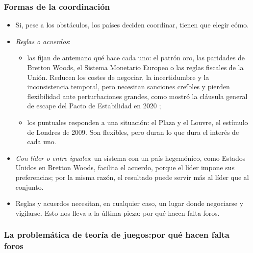 \documentclass[11pt]{article}
\begin{document}
\subsubsection{Formas de la coordinación}\label{sec:formas}

\begin{itemize}
\item Si, pese a los obstáculos, los países deciden coordinar, tienen que elegir cómo.
\item \emph{Reglas o acuerdos}:
  \begin{itemize}
  \item las  fijan de antemano qué hace cada uno: el patrón oro, las paridades de Bretton Woods, el Sistema Monetario Europeo  o las reglas fiscales de la Unión. Reducen los costes de negociar, la incertidumbre y la inconsistencia temporal, pero necesitan sanciones creíbles y pierden flexibilidad ante perturbaciones grandes, como mostró la cláusula general de escape del Pacto de Estabilidad en 2020 ;
  \item los  puntuales responden a una situación: el Plaza y el Louvre, el estímulo de Londres de 2009. Son flexibles, pero duran lo que dura el interés de cada uno.
  \end{itemize}
\item \emph{Con líder o entre iguales}: un sistema con un país hegemónico, como Estados Unidos en Bretton Woods, facilita el acuerdo, porque el líder impone sus preferencias; por la misma razón, el resultado puede servir más al líder que al conjunto.
\end{itemize}

\begin{itemize}
\item Reglas y acuerdos necesitan, en cualquier caso, un lugar donde negociarse y vigilarse. Esto nos lleva a la última pieza: por qué hacen falta foros.
\end{itemize}


\subsubsection{La problemática de teoría de juegos:\cortetitulo por qué hacen falta foros}\label{sec:problematica}
\end{document}
